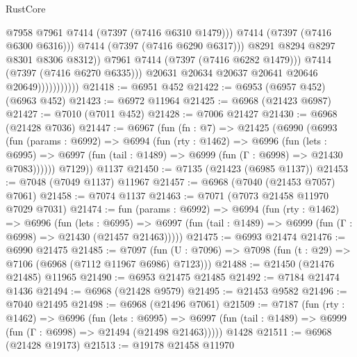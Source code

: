 \begin{lexlean}{RustCore}
\begin{coremodule}
                                        @7958
                                        @7961
                                        @7414
                                        (@7397 (@7416 @6310 @1479)))
                                      @7414
                                      (@7397 (@7416 @6300 @6316)))
                                    @7414
                                    (@7397 (@7416 @6290 @6317)))
                                  @8291
                                  @8294
                                  @8297
                                  @8301
                                  @8306
                                  @8312))
                              @7961
                              @7414
                              (@7397 (@7416 @6282 @1479)))
                            @7414
                            (@7397 (@7416 @6270 @6335)))
                          @20631
                          @20634
                          @20637
                          @20641
                          @20646
                          @20649)))))))))))
@21418 := @6951 @452
@21422 := @6953 (@6957 @452) (@6963 @452)
@21423 := @6972 @11964
@21425 := @6968 (@21423 @6987)
@21427 := @7010 (@7011 @452)
@21428 := @7006 @21427
@21430 := @6968 (@21428 @7036)
@21447 := @6967
    (fun (fn : @7) =>
    @21425
      (@6990
        (@6993
          (fun (params : @6992) =>
          @6994
            (fun (rty : @1462) =>
            @6996
              (fun (lets : @6995) =>
              @6997 (fun (tail : @1489) => @6999 (fun (Γ : @6998) => @21430 @7083))))))
        @7129))
    @1137
@21450 := @7135 (@21423 (@6985 @1137))
@21453 := @7048 (@7049 @1137) @11967
@21457 := @6968 (@7040 (@21453 @7057) @7061)
@21458 := @7074 @1137
@21463 := @7071 (@7073 @21458 @11970 @7029 @7031)
@21474 := fun (params : @6992) =>
  @6994
    (fun (rty : @1462) =>
    @6996
      (fun (lets : @6995) =>
      @6997 (fun (tail : @1489) => @6999 (fun (Γ : @6998) => @21430 (@21457 @21463)))))
@21475 := @6993 @21474
@21476 := @6990 @21475
@21485 := @7097
    (fun (U : @7096) => @7098 (fun (t : @29) => @7106 (@6968 (@7112 @11967 @6986) @7123)))
@21488 := @21450 (@21476 @21485) @11965
@21490 := @6953 @21475 @21485
@21492 := @7184 @21474 @1436
@21494 := @6968 (@21428 @9579)
@21495 := @21453 @9582
@21496 := @7040 @21495
@21498 := @6968 (@21496 @7061)
@21509 := @7187
    (fun (rty : @1462) =>
    @6996
      (fun (lets : @6995) =>
      @6997 (fun (tail : @1489) => @6999 (fun (Γ : @6998) => @21494 (@21498 @21463)))))
    @1428
@21511 := @6968 (@21428 @19173)
@21513 := @19178 @21458 @11970

\end{coremodule}
\end{lexlean}

